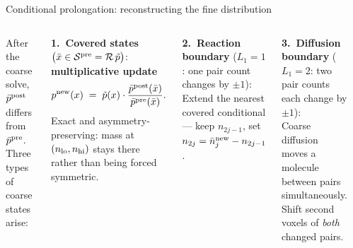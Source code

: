 \documentclass[10pt,aspectratio=169]{beamer}
\newcommand{\calR}{\mathcal{R}}
\begin{document}
\begin{frame}{Conditional prolongation: reconstructing the fine distribution}

\begin{columns}[T]

After the coarse solve, $\bar p^{\rm post}$ differs from $\bar p^{\rm pre}$.
Three types of coarse states arise:

\medskip
\textbf{1.~Covered states}
  $\bigl(\bar x \in \mathcal{S}^{\rm pre} = \calR\,\tilde p\bigr)$:
  \textbf{multiplicative update}
  \[
    p^{\rm new}(x) \;=\; \tilde p(x)\cdot
    \frac{\bar p^{\rm post}(\bar x)}{\bar p^{\rm pre}(\bar x)}.
  \]
  Exact and asymmetry-preserving: mass at $(n_{\rm lo},n_{\rm hi})$
  stays there rather than being forced symmetric.

\medskip
\textbf{2.~Reaction boundary} ($L_1 = 1$: one pair count changes by ${\pm}1$):\\
  Extend the nearest covered conditional --- keep $n_{2j-1}$,
  set $n_{2j} = \bar n_j^{\rm new} - n_{2j-1}$.

\medskip
\textbf{3.~Diffusion boundary} ($L_1 = 2$: two pair counts each change by ${\pm}1$):\\
  Coarse diffusion moves a molecule between pairs simultaneously.
  Shift second voxels of \emph{both} changed pairs.

\vspace{0.5em}

\begin{center}
\end{center}


\end{columns}
\end{frame}
\end{document}
